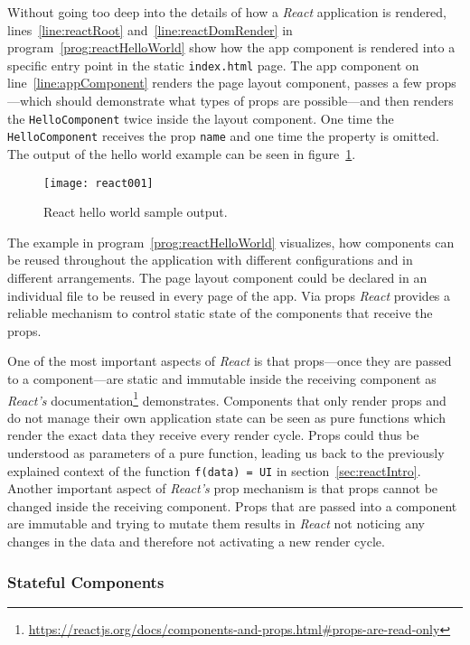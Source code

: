 Without going too deep into the details of how a \emph{React} application is rendered, lines~\ref{line:reactRoot} and~\ref{line:reactDomRender} in program~\ref{prog:reactHelloWorld} show how the app component is rendered into a specific entry point in the static \texttt{index.html} page. The app component on line~\ref{line:appComponent} renders the page layout component, passes a few props---which should demonstrate what types of props are possible---and then renders the \texttt{HelloComponent} twice inside the layout component. One time the \texttt{HelloComponent} receives the prop \texttt{name} and one time the property is omitted. The output of the hello world example can be seen in figure~\ref{fig:reactHelloWorld}. 

\begin{figure}
  \centering
  \texttt{[image: react001]}
  \caption{React hello world sample output.}
  \label{fig:reactHelloWorld}
\end{figure}

The example in program~\ref{prog:reactHelloWorld} visualizes, how components can be reused throughout the application with different configurations and in different arrangements. The page layout component could be declared in an individual file to be reused in every page of the app. Via props \emph{React} provides a reliable mechanism to control static state of the components that receive the props.

One of the most important aspects of \emph{React} is that props---once they are passed to a component---are static and immutable inside the receiving component as \emph{React's} documentation\footnote{\url{https://reactjs.org/docs/components-and-props.html\#props-are-read-only}} demonstrates. Components that only render props and do not manage their own application state can be seen as pure functions which render the exact data they receive every render cycle. Props could thus be understood as parameters of a pure function, leading us back to the previously explained context of the function \mbox{\texttt{f(data) = UI}} in section~\ref{sec:reactIntro}. Another important aspect of \emph{React's} prop mechanism is that props cannot be changed inside the receiving component. Props that are passed into a component are immutable and trying to mutate them results in \emph{React} not noticing any changes in the data and therefore not activating a new render cycle.

\subsubsection{Stateful Components}

